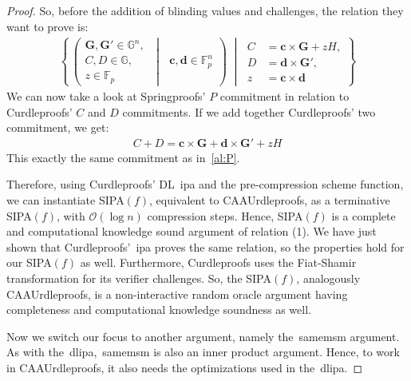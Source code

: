 \begin{proof}
    So, before the addition of blinding values and challenges, the relation they want to prove is:
    \begin{align}
        \left\{
        \, \left(
        \begin{aligned}
            \mathbf{G},\mathbf{G'}\in\mathbb{G}^n,\\
            C,D\in\mathbb{G},\\
            z\in\mathbb{F}_p
        \end{aligned}
        \;\middle|\;
        \begin{aligned}
            \mathbf{c},\mathbf{d}\in\mathbb{F}^n_p
        \end{aligned}
        \right)\;\middle|\;
        \begin{aligned}
            C &= \mathbf{c} \times \mathbf{G}+zH,\\
            D &= \mathbf{d} \times \mathbf{G'},\\
            z &= \mathbf{c} \times \mathbf{d}
        \end{aligned}
        \right\}
    \end{align}
    We can now take a look at Springproofs' $P$ commitment in relation to Curdleproofs' $C$ and $D$ commitments.
    If we add together Curdleproofs' two commitment, we get:
    \begin{align}
        C+D=\mathbf{c} \times \mathbf{G}+\mathbf{d} \times \mathbf{G'}+zH
    \end{align}
    This exactly the same commitment as in~\autoref{al:P}.

    Therefore, using Curdleproofs' DL~\gls{ipa} and the pre-compression scheme function, we can instantiate SIPA$(f)$, equivalent to CAAUrdleproofs, as a terminative SIPA$(f)$, with $\mathcal{O}(\log n)$ compression steps.
    Hence, SIPA$(f)$ is a complete and computational knowledge sound argument of relation (1).
    We have just shown that Curdleproofs'~\gls{ipa} proves the same relation, so the properties hold for our SIPA$(f)$ as well.
    Furthermore, Curdleproofs uses the Fiat-Shamir transformation for its verifier challenges.
    So, the SIPA$(f)$, analogously CAAUrdleproofs, is a non-interactive random oracle argument having completeness and computational knowledge soundness as well.

    Now we switch our focus to another argument, namely the~\gls{samemsm} argument.
    As with the~\gls{dlipa},~\gls{samemsm} is also an inner product argument.
    Hence, to work in CAAUrdleproofs, it also needs the optimizations used in the~\gls{dlipa}.


\end{proof}
